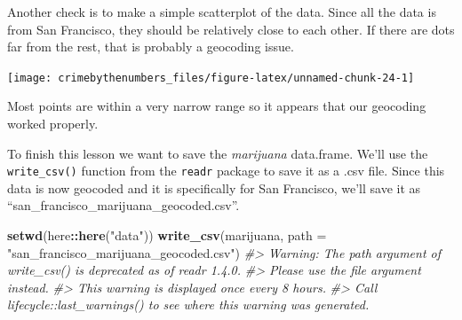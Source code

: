 \documentclass[
  12pt,
]{book}
\newenvironment{Shaded}{\begin{snugshade}}{\end{snugshade}}
\newcommand{\CommentTok}[1]{\textcolor[rgb]{0.37,0.37,0.37}{\textit{#1}}}
\newcommand{\DataTypeTok}[1]{\textcolor[rgb]{0.27,0.27,0.27}{#1}}
\newcommand{\KeywordTok}[1]{\textcolor[rgb]{0.27,0.27,0.27}{\textbf{#1}}}
\newcommand{\NormalTok}[1]{#1}
\newcommand{\OperatorTok}[1]{\textcolor[rgb]{0.43,0.43,0.43}{\textbf{#1}}}
\newcommand{\StringTok}[1]{\textcolor[rgb]{0.5,0.5,0.5}{#1}}
\begin{document}
\begin{Shaded}
\end{Shaded}

Another check is to make a simple scatterplot of the data. Since all the data is from San Francisco, they should be relatively close to each other. If there are dots far from the rest, that is probably a geocoding issue.

\begin{Shaded}
\end{Shaded}

\begin{center}\texttt{[image: crimebythenumbers\_files/figure-latex/unnamed-chunk-24-1]} \end{center}

Most points are within a very narrow range so it appears that our geocoding worked properly.

To finish this lesson we want to save the \emph{marijuana} data.frame. We'll use the \texttt{write\_csv()} function from the \texttt{readr} package to save it as a .csv file. Since this data is now geocoded and it is specifically for San Francisco, we'll save it as ``san\_francisco\_marijuana\_geocoded.csv''.

\begin{Shaded}
\begin{Highlighting}[]
\KeywordTok{setwd}\NormalTok{(here}\OperatorTok{::}\KeywordTok{here}\NormalTok{(}\StringTok{"data"}\NormalTok{))}
\KeywordTok{write\_csv}\NormalTok{(marijuana, }\DataTypeTok{path =} \StringTok{"san\_francisco\_marijuana\_geocoded.csv"}\NormalTok{)}
\CommentTok{\#\textgreater{} Warning: The \textasciigrave{}path\textasciigrave{} argument of \textasciigrave{}write\_csv()\textasciigrave{} is deprecated as of readr 1.4.0.}
\CommentTok{\#\textgreater{} Please use the \textasciigrave{}file\textasciigrave{} argument instead.}
\CommentTok{\#\textgreater{} This warning is displayed once every 8 hours.}
\CommentTok{\#\textgreater{} Call \textasciigrave{}lifecycle::last\_warnings()\textasciigrave{} to see where this warning was generated.}
\end{Highlighting}
\end{Shaded}
\end{document}
